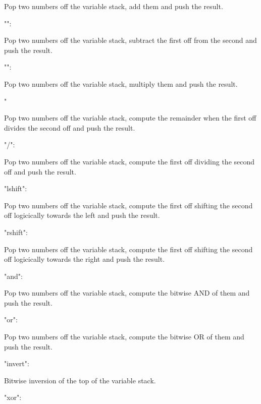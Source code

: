 Pop two numbers off the variable stack, add them and push the result. \begin{DoxyVerb}   "\-":
\end{DoxyVerb}


Pop two numbers off the variable stack, subtract the first off from the second and push the result. \begin{DoxyVerb}   "\*":
\end{DoxyVerb}


Pop two numbers off the variable stack, multiply them and push the result. \begin{DoxyVerb}   "%
\end{DoxyVerb}


Pop two numbers off the variable stack, compute the remainder when the first off divides the second off and push the result. \begin{DoxyVerb}   "/":
\end{DoxyVerb}


Pop two numbers off the variable stack, compute the first off dividing the second off and push the result. \begin{DoxyVerb}   "lshift":
\end{DoxyVerb}


Pop two numbers off the variable stack, compute the first off shifting the second off logicically towards the left and push the result. \begin{DoxyVerb}   "rshift":
\end{DoxyVerb}


Pop two numbers off the variable stack, compute the first off shifting the second off logicically towards the right and push the result. \begin{DoxyVerb}   "and":
\end{DoxyVerb}


Pop two numbers off the variable stack, compute the bitwise A\-N\-D of them and push the result. \begin{DoxyVerb}   "or":
\end{DoxyVerb}


Pop two numbers off the variable stack, compute the bitwise O\-R of them and push the result. \begin{DoxyVerb}   "invert":
\end{DoxyVerb}


Bitwise inversion of the top of the variable stack. \begin{DoxyVerb}   "xor":
\end{DoxyVerb}


